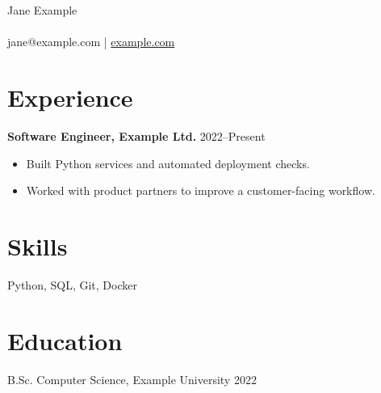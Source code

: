 \documentclass[11pt,a4paper]{article}
\begin{document}
\begin{center}
  {\LARGE Jane Example}\\
  \\
  jane@example.com \quad | \quad \href{https://example.com}{example.com}
\end{center}

\section*{Experience}
\textbf{Software Engineer, Example Ltd.} \hfill 2022--Present
\begin{itemize}
  \item Built Python services and automated deployment checks.
  \item Worked with product partners to improve a customer-facing workflow.
\end{itemize}

\section*{Skills}
Python, SQL, Git, Docker

\section*{Education}
B.Sc. Computer Science, Example University \hfill 2022
\end{document}
